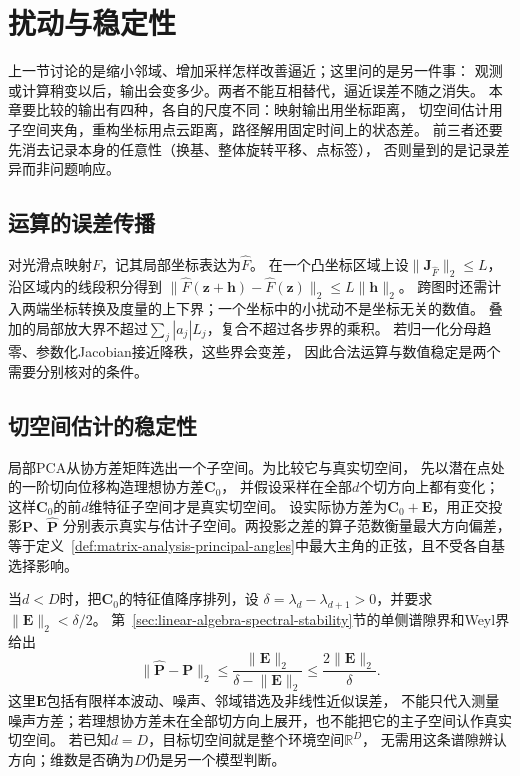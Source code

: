 \section{扰动与稳定性}
\label{sec:geometry-stability}

上一节讨论的是缩小邻域、增加采样怎样改善逼近；这里问的是另一件事：
观测或计算稍变以后，输出会变多少。两者不能互相替代，逼近误差不随之消失。
本章要比较的输出有四种，各自的尺度不同：映射输出用坐标距离，
切空间估计用子空间夹角，重构坐标用点云距离，路径解用固定时间上的状态差。
前三者还要先消去记录本身的任意性（换基、整体旋转平移、点标签），
否则量到的是记录差异而非问题响应。

\subsection{运算的误差传播}
\label{sec:geometry-operation-stability}

对光滑点映射$F$，记其局部坐标表达为$\widehat F$。
在一个凸坐标区域上设$\lVert\bm J_{\widehat F}\rVert_2\leq L$，
沿区域内的线段积分得到
$\lVert\widehat F(\bm z+\bm h)-\widehat F(\bm z)\rVert_2
\leq L\lVert\bm h\rVert_2$。
跨图时还需计入两端坐标转换及度量的上下界；一个坐标中的小扰动不是坐标无关的数值。
叠加的局部放大界不超过$\sum_j|a_j|L_j$，复合不超过各步界的乘积。
若归一化分母趋零、参数化Jacobian接近降秩，这些界会变差，
因此合法运算与数值稳定是两个需要分别核对的条件。

\subsection{切空间估计的稳定性}
\label{sec:geometry-tangent-estimate-stability}

局部PCA从协方差矩阵选出一个子空间。为比较它与真实切空间，
先以潜在点处的一阶切向位移构造理想协方差$\bm C_0$，
并假设采样在全部$d$个切方向上都有变化；这样$\bm C_0$的前$d$维特征子空间才是真实切空间。
设实际协方差为$\bm C_0+\bm E$，用正交投影$\bm P$、$\widehat{\bm P}$
分别表示真实与估计子空间。两投影之差的算子范数衡量最大方向偏差，
等于定义~\ref{def:matrix-analysis-principal-angles}中最大主角的正弦，且不受各自基选择影响。

当$d<D$时，把$\bm C_0$的特征值降序排列，设
$\delta=\lambda_d-\lambda_{d+1}>0$，并要求$\lVert\bm E\rVert_2<\delta/2$。
第~\ref{sec:linear-algebra-spectral-stability}节的单侧谱隙界和Weyl界给出
\[
 \lVert\widehat{\bm P}-\bm P\rVert_2
 \leq\frac{\lVert\bm E\rVert_2}{\delta-\lVert\bm E\rVert_2}
 \leq\frac{2\lVert\bm E\rVert_2}{\delta}.
\]
这里$\bm E$包括有限样本波动、噪声、邻域错选及非线性近似误差，
不能只代入测量噪声方差；若理想协方差未在全部切方向上展开，也不能把它的主子空间认作真实切空间。
若已知$d=D$，目标切空间就是整个环境空间$\mathbb R^D$，
无需用这条谱隙辨认方向；维数是否确为$D$仍是另一个模型判断。

